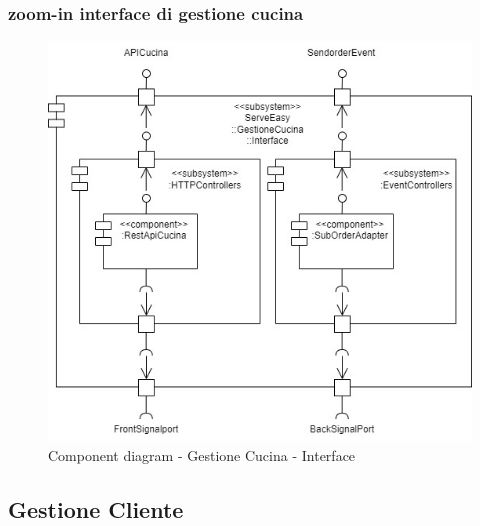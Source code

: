 \subsubsection{zoom-in interface di gestione cucina}
\begin{figure}[H]
	\centering
	\includegraphics[scale=0.5]{iterazione1/images/component_comanda_cucina-GestioneCucina__Interface.jpg}
	\caption{Component diagram - Gestione Cucina - Interface \label{fig:component_diagram_gestione_cucina_interface}}
\end{figure}

\subsection{Gestione Cliente}
